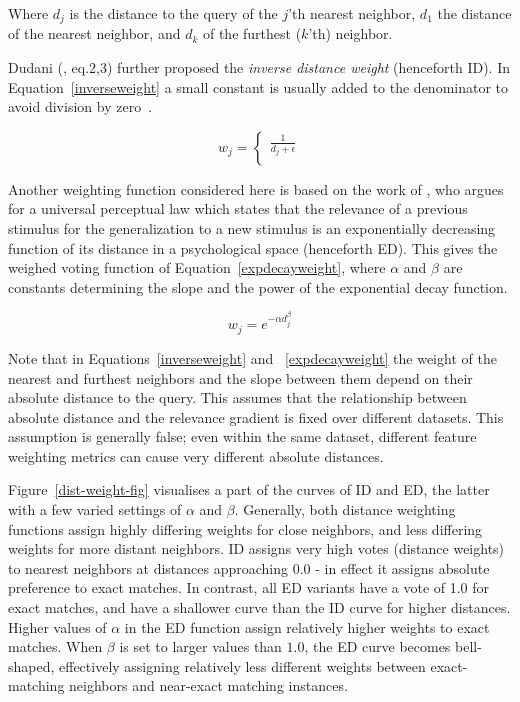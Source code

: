 \documentclass{report}
\begin{document}
Where $d_{j}$ is the distance to the query of the $j$'th nearest
neighbor, $d_{1}$ the distance of the nearest neighbor, and $d_{k}$ of
the furthest ($k$'th) neighbor.

Dudani (, eq.2,3) further proposed the {\em inverse
distance weight} (henceforth ID). In Equation~\ref{inverseweight} a
small constant is usually added to the denominator to avoid division
by zero~\cite{Wettschereck94}.

\begin{equation}
\label{inverseweight}
w_{j}= \left \{ \begin{array}{ll}  
                        \frac{1}{d_{j} + \epsilon} \\ 
                    \end{array} 
          \right. 
\end{equation}

Another weighting function considered here is based on the work of
, who argues for a universal perceptual law which
states that the relevance of a previous stimulus for the
generalization to a new stimulus is an exponentially decreasing
function of its distance in a psychological space (henceforth
ED). This gives the weighed voting function of
Equation~\ref{expdecayweight}, where $\alpha$ and $\beta$ are
constants determining the slope and the power of the exponential decay
function.

\begin{equation}
\label{expdecayweight}
w_{j}= e^{-\alpha d_{j}^\beta}
\end{equation}

Note that in Equations~\ref{inverseweight} and ~\ref{expdecayweight}
the weight of the nearest and furthest neighbors and the slope between
them depend on their absolute distance to the query. This assumes that
the relationship between absolute distance and the relevance gradient
is fixed over different datasets. This assumption is generally false;
even within the same dataset, different feature weighting metrics can
cause very different absolute distances. 

Figure~\ref{dist-weight-fig} visualises a part of the curves of ID and
ED, the latter with a few varied settings of $\alpha$ and
$\beta$. Generally, both distance weighting functions assign highly
differing weights for close neighbors, and less differing weights for
more distant neighbors. ID assigns very high votes (distance weights)
to nearest neighbors at distances approaching 0.0 - in effect it
assigns absolute preference to exact matches. In contrast, all ED
variants have a vote of 1.0 for exact matches, and have a shallower
curve than the ID curve for higher distances. Higher values of
$\alpha$ in the ED function assign relatively higher weights to exact
matches. When $\beta$ is set to larger values than $1.0$, the ED curve
becomes bell-shaped, effectively assigning relatively less different
weights between exact-matching neighbors and near-exact matching
instances.
\end{document}
